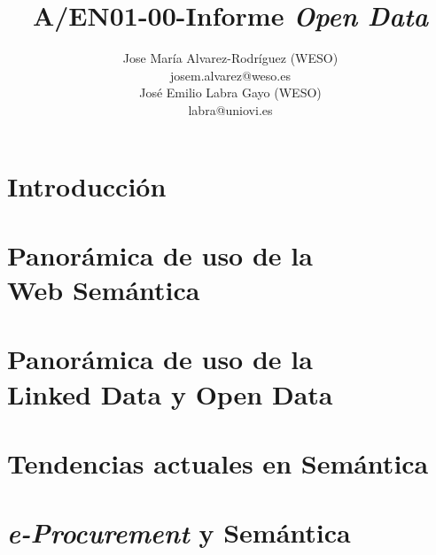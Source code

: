\documentclass[a4paper,twoside,12pt]{report}
\begin{document}
\title{A/EN01-00-Informe \textit{Open Data}}


\author{
{Jose María Alvarez-Rodríguez (WESO)\\
josem.alvarez@weso.es \\
José Emilio Labra Gayo (WESO) \\
labra@uniovi.es}}









\coverpages

\setcounter{page}{0}





\setlength{\parskip}{0.0cm}
\tableofcontents
\listoffigures
\listoftables
\setlength{\parskip}{1.0ex}

\newpage
{}



\chapter{\label{capitulo:introduccion}Introducción} %
% 
\chapter{\label{capitulo:semantica}Panorámica de uso de la\\ Web Semántica} 

\chapter{\label{capitulo:semantica}Panorámica de uso de la\\ Linked Data y Open Data} 

\chapter{\label{capitulo:eproc-sm}Tendencias actuales en Semántica} 

\chapter{\label{capitulo:eproc-sm}\textit{e-Procurement} y Semántica} 


\printindex
\printglossaries


\insertbibliography
\end{document}
